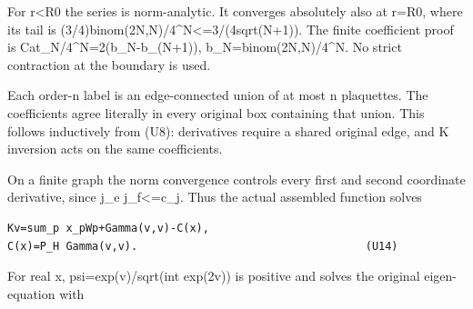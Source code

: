 \documentclass[11pt,a4paper]{article}
\renewcommand{\[}{\begingroup\small\originaldisplaystart}
\renewcommand{\]}{\originaldisplayend\endgroup}
\begin{document}
For r\textless R0 the series is norm-analytic. It converges absolutely
also at r=R0, where its tail is
{(\allowbreak{}3\allowbreak{}/\allowbreak{}4\allowbreak{})\allowbreak{}b\allowbreak{}i\allowbreak{}n\allowbreak{}o\allowbreak{}m\allowbreak{}(\allowbreak{}2\allowbreak{}N\allowbreak{},\allowbreak{}N\allowbreak{})\allowbreak{}/\allowbreak{}4\allowbreak{}\textasciicircum{}\allowbreak{}N\allowbreak{}\textless{}\allowbreak{}=\allowbreak{}3\allowbreak{}/\allowbreak{}(\allowbreak{}4\allowbreak{}s\allowbreak{}q\allowbreak{}r\allowbreak{}t\allowbreak{}(\allowbreak{}N\allowbreak{}+\allowbreak{}1\allowbreak{})\allowbreak{})\allowbreak{}.\allowbreak{}}
The finite coefficient proof is
{C\allowbreak{}a\allowbreak{}t\allowbreak{}\_\allowbreak{}N\allowbreak{}/\allowbreak{}4\allowbreak{}\textasciicircum{}\allowbreak{}N\allowbreak{}=\allowbreak{}2\allowbreak{}(\allowbreak{}b\allowbreak{}\_\allowbreak{}N\allowbreak{}-\allowbreak{}b\allowbreak{}\_\allowbreak{}(\allowbreak{}N\allowbreak{}+\allowbreak{}1\allowbreak{})\allowbreak{})\allowbreak{},\allowbreak{}}
{b\allowbreak{}\_\allowbreak{}N\allowbreak{}=\allowbreak{}b\allowbreak{}i\allowbreak{}n\allowbreak{}o\allowbreak{}m\allowbreak{}(\allowbreak{}2\allowbreak{}N\allowbreak{},\allowbreak{}N\allowbreak{})\allowbreak{}/\allowbreak{}4\allowbreak{}\textasciicircum{}\allowbreak{}N\allowbreak{}.\allowbreak{}}
No strict contraction at the boundary is used.

Each order-n label is an edge-connected union of at most n plaquettes.
The coefficients agree literally in every original box containing that
union. This follows inductively from (U8): derivatives require a shared
original edge, and K inversion acts on the same coefficients.

On a finite graph the norm convergence controls every first and second
coordinate derivative, since j\_e j\_f\textless=c\_j. Thus the actual
assembled function solves

\begin{verbatim}
Kv=sum_p x_pWp+Gamma(v,v)-C(x),
C(x)=P_H Gamma(v,v).                                   (U14)
\end{verbatim}

For real x,
{p\allowbreak{}s\allowbreak{}i\allowbreak{}=\allowbreak{}e\allowbreak{}x\allowbreak{}p\allowbreak{}(\allowbreak{}v\allowbreak{})\allowbreak{}/\allowbreak{}s\allowbreak{}q\allowbreak{}r\allowbreak{}t\allowbreak{}(\allowbreak{}i\allowbreak{}n\allowbreak{}t\allowbreak{}}
exp(2v)) is positive and solves the original eigen-equation with
\end{document}

